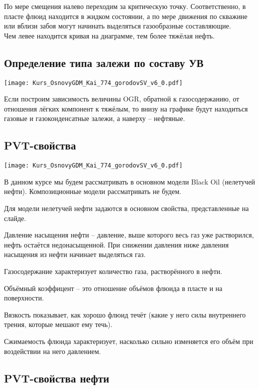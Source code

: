 \documentclass[main.tex]{subfiles}
\begin{document}
По мере смещения налево переходим за критическую точку.
Соответственно, в пласте флюид находится в жидком состоянии, а по мере движения по скважине или вблизи забоя могут начинать выделяться газообразные составляющие.
\\

Чем левее находится кривая на диаграмме, тем более тяжёлая нефть.

\subsection{Определение типа залежи по составу УВ}

\texttt{[image: Kurs\_OsnovyGDM\_Kai\_774\_gorodovSV\_v6\_0.pdf]}

Если построим зависимость величины OGR, обратной к газосодержанию, от отношения лёгких компонент к тяжёлым, то внизу на графике будут находиться газовые и газоконденсатные залежи, а наверху -- нефтяные.

\subsection{PVT-свойства}

\texttt{[image: Kurs\_OsnovyGDM\_Kai\_774\_gorodovSV\_v6\_0.pdf]}

В данном курсе мы будем рассматривать в основном модели Black Oil (нелетучей нефти). Композиционные модели рассматривать не будем.

Для модели нелетучей нефти задаются в основном свойства, представленные на слайде.

Давление насыщения нефти -- давление, выше которого весь газ уже растворился, нефть остаётся недонасыщенной.
При снижении давления ниже давления насыщения из нефти начинает выделяться газ.

Газосодержание характеризует количество газа, растворённого в нефти.

Объёмный коэффицент -- это отношение объёмов флюида в пласте и на поверхности.

Вязкость показывает, как хорошо флюид течёт (какие у него силы внутреннего трения, которые мешают ему течь).

Сжимаемость флюида характеризует, насколько сильно изменяется его объём при воздействии на него давлением.

\subsection{PVT-свойства нефти}
\end{document}
